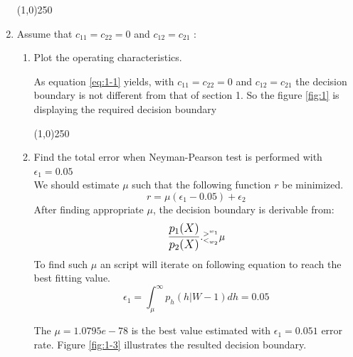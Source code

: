 \documentclass[12pt]{article}
\newcommand{\gl}{^{>^{w_1}}_{<_{w_2}}}
\begin{document}
\begin{enumerate}
\begin{center}
\line(1,0){250}
\end{center}

\item Assume that $c_{11} = c_{22} = 0$ and $c_{12} = c_{21}$ :
\begin{enumerate}

\item Plot the operating characteristics.

As equation \eqref{eq:1-1} yields, with $c_{11} = c_{22} = 0$ and $c_{12} = c_{21}$ the decision boundary is not different from that of section 1. So the figure \ref{fig:1} is displaying the required decision boundary

\begin{center}
\line(1,0){250}
\end{center}

\item Find the total error when Neyman-Pearson test is performed with $\epsilon_1 = 0.05$ \\

We should estimate $\mu$ such that the following function $r$ be minimized.
\begin{equation}
r = \mu(\epsilon_1 - 0.05) + \epsilon_2
\end{equation}
After finding appropriate $\mu$, the decision boundary is derivable from:
\begin{equation}
\mathlarger{\frac{p_1(X)}{p_2(X)}} .\gl \mu
\end{equation}
To find such $\mu$ an script will iterate on following equation to reach the best fitting value.
\begin{equation}
\epsilon_1 = \int^{\infty}_\mu p_h(h|W-1) dh = 0.05
\end{equation}

The $\mu = 1.0795e-78$ is the best value estimated with $\epsilon_1 = 0.051$ error rate. Figure \ref{fig:1-3} illustrates the resulted decision boundary.


\end{enumerate}
\end{enumerate}
\end{document}
